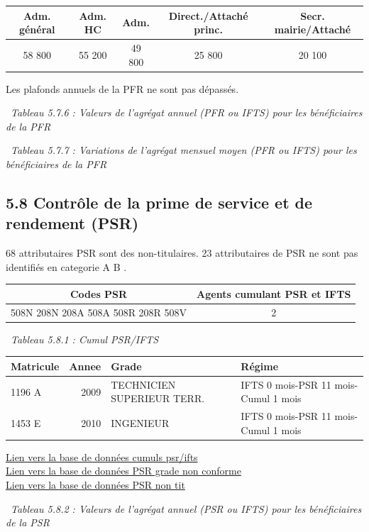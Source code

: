 \begin{longtable}[]{@{}ccccc@{}}
\toprule
Adm. général & Adm. HC & Adm. & Direct./Attaché princ. & Secr.
mairie/Attaché\tabularnewline
\midrule
\endhead
58 800 & 55 200 & 49 800 & 25 800 & 20 100\tabularnewline
\bottomrule
\end{longtable}

Les plafonds annuels de la PFR ne sont pas dépassés.

~\emph{Tableau 5.7.6 : Valeurs de l'agrégat annuel (PFR ou IFTS) pour
les bénéficiaires de la PFR}

~\emph{Tableau 5.7.7 : Variations de l'agrégat mensuel moyen (PFR ou
IFTS) pour les bénéficiaires de la PFR}

\hypertarget{controle-de-la-prime-de-service-et-de-rendement-psr}{%
\subsection{5.8 Contrôle de la prime de service et de rendement
(PSR)}\label{controle-de-la-prime-de-service-et-de-rendement-psr}}

68 attributaires PSR sont des non-titulaires. 23 attributaires de PSR ne
sont pas identifiés en categorie A B .

\begin{longtable}[]{@{}cc@{}}
\toprule
Codes PSR & Agents cumulant PSR et IFTS\tabularnewline
\midrule
\endhead
508N 208N 208A 508A 508R 208R 508V & 2\tabularnewline
\bottomrule
\end{longtable}

~\emph{Tableau 5.8.1 : Cumul PSR/IFTS}

\begin{longtable}[]{@{}lrll@{}}
\toprule
Matricule & Annee & Grade & Régime\tabularnewline
\midrule
\endhead
1196 A & 2009 & TECHNICIEN SUPERIEUR TERR. & IFTS 0 mois-PSR 11
mois-Cumul 1 mois\tabularnewline
1453 E & 2010 & INGENIEUR & IFTS 0 mois-PSR 11 mois-Cumul 1
mois\tabularnewline
\bottomrule
\end{longtable}

\href{../Bases/Reglementation/personnels.psr.ifts.csv}{Lien vers la base de
données cumuls psr/ifts}\\
\href{../Bases/Reglementation/PSR.non.catAB.csv}{Lien vers la base de
données PSR grade non conforme}\\
\href{../Bases/Reglementation/PSR.non.tit.csv}{Lien vers la base de données
PSR non tit}

~\emph{Tableau 5.8.2 : Valeurs de l'agrégat annuel (PSR ou IFTS) pour
les bénéficiaires de la PSR}

